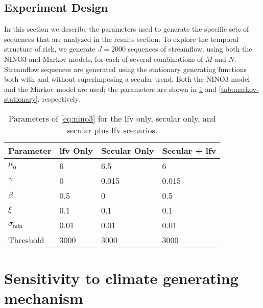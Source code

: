 \documentclass[
  draft,
  linenumbers
]{agujournal2018}
\begin{document}
\subsection{Experiment Design}\label{sec:methods-experiments}

In this section we describe the parameters used to generate the specific sets of sequences that are analyzed in the results section.
To explore the temporal structure of risk, we generate $J=2000$ sequences of streamflow, using both the NINO3 and Markov models, for each of several combinations of $M$ and $N$.
Streamflow sequences are generated using the stationary generating functions both with and without superimposing a secular trend.
Both the NINO3 model and the Markov model are used; the parameters are shown in \cref{tab:nino-stationary} and \cref{tab:markov-stationary}, respectively.

\begin{table}[ht]
  \centering
  \begin{tabular}{llll}
    \toprule
    Parameter & \gls{lfv} Only & Secular Only & Secular + \gls{lfv} \\
    \midrule
    $\mu_0$             & 6     & 6.5   & 6 \\
    $\gamma$            & 0     & 0.015 & 0.015\\
    $\beta$             & 0.5   & 0     & 0.5\\
    $\xi$               & 0.1   & 0.1   & 0.1\\
    $\sigma_\text{min}$ & 0.01  & 0.01  & 0.01\\
    Threshold           & 3000  & 3000  & 3000 \\
    \bottomrule
  \end{tabular}
  \caption{
    Parameters of \cref{eq:nino3} for the \gls{lfv} only, secular only, and secular plus \gls{lfv} scenarios.
  }\label{tab:nino-stationary}
\end{table}

\section{Sensitivity to climate generating mechanism}\label{sec:markov-generating}
\end{document}
